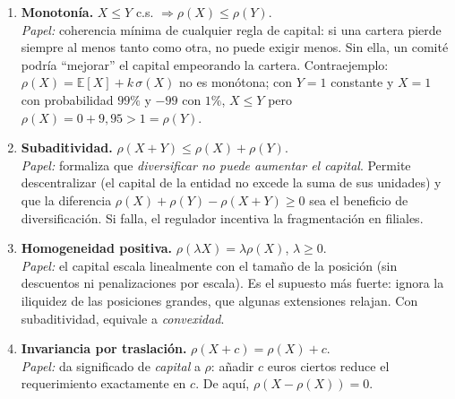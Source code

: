 \documentclass[a4paper,12pt]{article}
\newcommand{\E}{\mathbb{E}}
\begin{document}
\begin{enumerate}[leftmargin=*]
\item \textbf{Monoton\'ia.} $X\le Y$ c.s. $\Rightarrow\rho(X)\le\rho(Y)$.\\
\emph{Papel:} coherencia m\'inima de cualquier regla de capital: si una cartera pierde siempre al menos tanto como otra, no puede exigir menos. Sin ella, un comit\'e podr\'ia ``mejorar'' el capital empeorando la cartera. Contraejemplo: $\rho(X)=\E[X]+k\,\sigma(X)$ no es mon\'otona; con $Y=1$ constante y $X=1$ con probabilidad $99\%$ y $-99$ con $1\%$, $X\le Y$ pero $\rho(X)=0+9{,}95>1=\rho(Y)$.
\item \textbf{Subaditividad.} $\rho(X+Y)\le\rho(X)+\rho(Y)$.\\
\emph{Papel:} formaliza que \emph{diversificar no puede aumentar el capital}. Permite descentralizar (el capital de la entidad no excede la suma de sus unidades) y que la diferencia $\rho(X)+\rho(Y)-\rho(X+Y)\ge0$ sea el beneficio de diversificaci\'on. Si falla, el regulador incentiva la fragmentaci\'on en filiales.
\item \textbf{Homogeneidad positiva.} $\rho(\lambda X)=\lambda\rho(X)$, $\lambda\ge0$.\\
\emph{Papel:} el capital escala linealmente con el tama\~no de la posici\'on (sin descuentos ni penalizaciones por escala). Es el supuesto m\'as fuerte: ignora la iliquidez de las posiciones grandes, que algunas extensiones relajan. Con subaditividad, equivale a \emph{convexidad}.
\item \textbf{Invariancia por traslaci\'on.} $\rho(X+c)=\rho(X)+c$.\\
\emph{Papel:} da significado de \emph{capital} a $\rho$: a\~nadir $c$ euros ciertos reduce el requerimiento exactamente en $c$. De aqu\'i, $\rho(X-\rho(X))=0$.
\end{enumerate}
\end{document}
